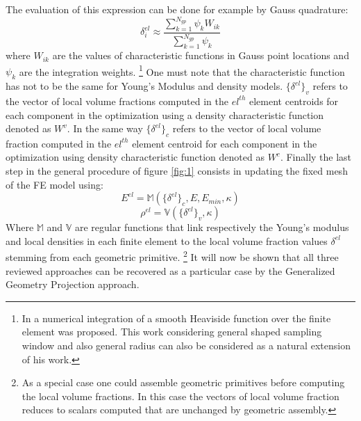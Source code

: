  The evaluation of this expression can be done for example by Gauss quadrature:
 \begin{equation}
    \delta_i^{el} \approx \frac{\sum_{k=1}^{N_{gp}}{\psi_kW_{ik}}}{\sum_{k=1}^{N_{gp}}{\psi_k}}
 \end{equation}
 where $W_{ik}$ are the values of characteristic functions in Gauss point locations and $\psi_k$ are the integration weights. \footnote{In \cite{Wein2018} a  numerical integration of a smooth Heaviside function over the finite element was proposed. This work considering general shaped sampling window and also general radius can also be considered as a natural extension of his work.}
 One must note that the characteristic function has not to be the same for Young's Modulus and density models. $\lbrace\delta^{el}\rbrace_v$ refers to the vector of local volume fractions computed in the $el^{th}$ element centroids for each component in the optimization using a density characteristic function denoted as $W^v$. In the same way $\lbrace\delta^{el}\rbrace_c$ refers to the vector of local volume fraction computed in the $el^{th}$ element centroid for each component in the optimization using density characteristic function denoted as $W^c$.
 Finally the last step in the general procedure of figure \ref{fig:1} consists in updating the fixed mesh of the FE model using:
 \begin{equation}
     E^{el}=\mathbb{M}(\lbrace\delta^{el}\rbrace_c,E,E_{min},\kappa)
 \end{equation}
  \begin{equation}
     \rho^{el}=\mathbb{V}(\lbrace\delta^{el}\rbrace_v,\kappa)
 \end{equation}
 Where $\mathbb{M}$ and $\mathbb{V}$ are regular functions that link respectively the Young's modulus and local densities in each finite element to the local volume fraction values $\delta^{el}$ stemming from each geometric primitive.  \footnote{As a special case one could assemble geometric primitives before computing the local volume fractions.
 In this case the vectors of local volume fraction reduces to scalars computed that are unchanged by geometric assembly.}
 It will now be shown that all three reviewed approaches can be recovered as a particular case by the Generalized Geometry Projection approach.
 
